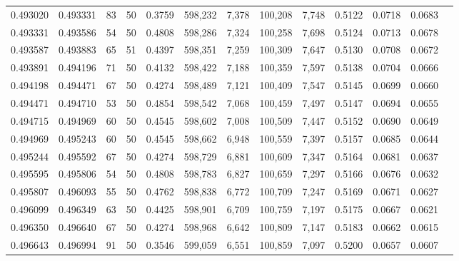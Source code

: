 \begin{tabular}{rrrrrrrrrrrrr}
0.493020 & 0.493331 &    83 &  50 &                                     0.3759 & 598,232 &   7,378 & 100,208 &   7,748 & 0.5122 & 0.0718 & 0.0683 \\
0.493331 & 0.493586 &    54 &  50 &                                     0.4808 & 598,286 &   7,324 & 100,258 &   7,698 & 0.5124 & 0.0713 & 0.0678 \\
0.493587 & 0.493883 &    65 &  51 &                                     0.4397 & 598,351 &   7,259 & 100,309 &   7,647 & 0.5130 & 0.0708 & 0.0672 \\
0.493891 & 0.494196 &    71 &  50 &                                     0.4132 & 598,422 &   7,188 & 100,359 &   7,597 & 0.5138 & 0.0704 & 0.0666 \\
0.494198 & 0.494471 &    67 &  50 &                                     0.4274 & 598,489 &   7,121 & 100,409 &   7,547 & 0.5145 & 0.0699 & 0.0660 \\
0.494471 & 0.494710 &    53 &  50 &                                     0.4854 & 598,542 &   7,068 & 100,459 &   7,497 & 0.5147 & 0.0694 & 0.0655 \\
0.494715 & 0.494969 &    60 &  50 &                                     0.4545 & 598,602 &   7,008 & 100,509 &   7,447 & 0.5152 & 0.0690 & 0.0649 \\
0.494969 & 0.495243 &    60 &  50 &                                     0.4545 & 598,662 &   6,948 & 100,559 &   7,397 & 0.5157 & 0.0685 & 0.0644 \\
0.495244 & 0.495592 &    67 &  50 &                                     0.4274 & 598,729 &   6,881 & 100,609 &   7,347 & 0.5164 & 0.0681 & 0.0637 \\
0.495595 & 0.495806 &    54 &  50 &                                     0.4808 & 598,783 &   6,827 & 100,659 &   7,297 & 0.5166 & 0.0676 & 0.0632 \\
0.495807 & 0.496093 &    55 &  50 &                                     0.4762 & 598,838 &   6,772 & 100,709 &   7,247 & 0.5169 & 0.0671 & 0.0627 \\
0.496099 & 0.496349 &    63 &  50 &                                     0.4425 & 598,901 &   6,709 & 100,759 &   7,197 & 0.5175 & 0.0667 & 0.0621 \\
0.496350 & 0.496640 &    67 &  50 &                                     0.4274 & 598,968 &   6,642 & 100,809 &   7,147 & 0.5183 & 0.0662 & 0.0615 \\
0.496643 & 0.496994 &    91 &  50 &                                     0.3546 & 599,059 &   6,551 & 100,859 &   7,097 & 0.5200 & 0.0657 & 0.0607 \\

\end{tabular}
